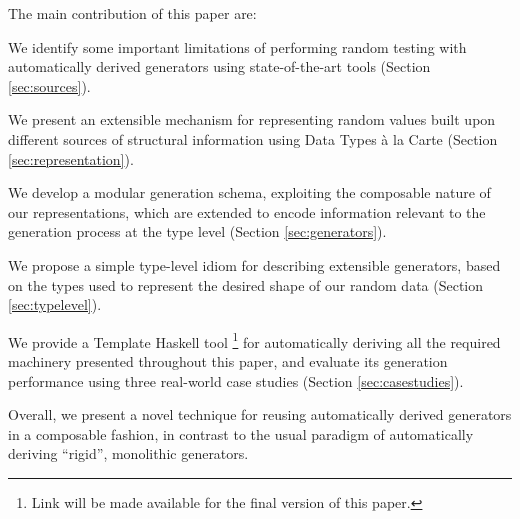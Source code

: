%
%
The main contribution of this paper are:
%
\begin{CompactItemize}
\item We identify some important limitations of performing random testing with
  automatically derived generators using state-of-the-art tools (Section
  \ref{sec:sources}).
\item We present an extensible mechanism for representing random values built
  upon different sources of structural information using Data Types \`a la Carte
  (Section \ref{sec:representation}).
\item We develop a modular generation schema, exploiting the composable nature
  of our representations, which are extended to encode information relevant to
  the generation process at the type level (Section \ref{sec:generators}).
\item We propose a simple type-level idiom for describing extensible generators,
  based on the types used to represent the desired shape of our random data
  (Section \ref{sec:typelevel}).
\item We provide a Template Haskell tool%
  \footnote{Link will be made available for the final version of this paper.}
  for automatically deriving all the required machinery presented throughout
  this paper, and evaluate its generation performance using three real-world
  case studies (Section \ref{sec:casestudies}).
\end{CompactItemize}
%
Overall, we present a novel technique for reusing automatically derived
generators in a composable fashion, in contrast to the usual paradigm of
automatically deriving ``rigid'', monolithic generators.
